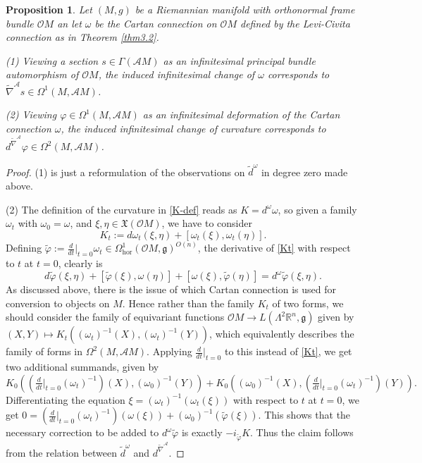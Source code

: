 \documentclass[12pt,a4paper]{amsart}
\def\frak{\mathfrak}
\def\Bbb{\mathbb}
\def\Cal{\mathcal}
\let\phi\varphi
\newcommand{\om}{\omega}
\newcommand{\ph}{\phi}
\newcommand{\Ga}{\Gamma}
\newcommand{\La}{\Lambda}
\newcommand{\Om}{\Omega}
\newcommand{\tn}{\widetilde{\nabla}}
\newcommand{\hor}{\text{hor}}
\newcounter{theorem}
\numberwithin{theorem}{section}
\numberwithin{equation}{section}
\newtheorem{prop}[theorem]{Proposition}
\theoremstyle{definition}
\theoremstyle{remark}
\begin{document}
\begin{prop}\label{prop3.4}
  Let $(M,g)$ be a Riemannian manifold with orthonormal frame bundle $\Cal OM$ an let
  $\om$ be the Cartan connection on $\Cal OM$ defined by the Levi-Civita connection
  as in Theorem \ref{thm3.2}.

  (1) Viewing a section $s\in\Ga(\Cal AM)$ as an infinitesimal principal bundle
  automorphism of $\Cal OM$, the induced infinitesimal change of $\om$ corresponds to
  $\tn^{\Cal A}s\in\Om^1(M,\Cal AM)$.

  (2) Viewing $\ph\in\Om^1(M,\Cal AM)$ as an infinitesimal deformation of the Cartan
  connection $\om$, the induced infinitesimal change of curvature corresponds to
  $d^{\tn^{\Cal A}}\ph\in\Om^2(M,\Cal AM)$.
\end{prop}
\begin{proof}
(1) is just a reformulation of the observations on $\widetilde{d}^\om$ in degree zero
  made above.

(2) The definition of the curvature in \eqref{K-def} reads as $K=d^\om \om$, so given
  a family $\om_t$ with $\om_0=\om$, and $\xi,\eta\in\frak X(\Cal OM)$, we have to
  consider
  \begin{equation}\label{Kt}
    K_t:=d\om_t(\xi,\eta)+[\om_t(\xi),\om_t(\eta)].
  \end{equation}
  Defining $\widetilde{\ph}:=\frac{d}{dt}|_{t=0}\om_t\in\Om^1_{\hor}(\Cal OM,\frak
  g)^{O(n)}$, the derivative of \eqref{Kt} with respect to $t$ at $t=0$, clearly is
  $$
  d\widetilde{\ph}(\xi,\eta)+[\widetilde{\ph}(\xi),\om(\eta)]+[\om(\xi),\widetilde{\ph}(\eta)]=
  d^\om\widetilde{\ph}(\xi,\eta).
  $$
  As discussed above, there is the issue of which Cartan connection is used for
  conversion to objects on $M$. Hence rather than the family $K_t$ of two forms, we
  should consider the family of equivariant functions $\Cal OM\to L(\La^2\Bbb
  R^n,\frak g)$ given by $(X,Y)\mapsto K_t((\om_t)^{-1}(X),(\om_t)^{-1}(Y))$, which
  equivalently describes the family of forms in $\Om^2(M,\Cal AM)$. Applying
  $\frac{d}{dt}|_{t=0}$ to this instead of \eqref{Kt}, we get two additional
  summands, given by
  $$
  K_0((\tfrac{d}{dt}|_{t=0}(\om_t)^{-1})(X),(\om_0)^{-1}(Y))+K_0((\om_0)^{-1}(X),
  (\tfrac{d}{dt}|_{t=0}(\om_t)^{-1})(Y)).
  $$ Differentiating the equation $\xi=(\om_t)^{-1}(\om_t(\xi))$ with respect to $t$
  at $t=0$, we get
  $0=(\frac{d}{dt}|_{t=0}(\om_t)^{-1})(\om(\xi))+(\om_0)^{-1}(\widetilde{\ph}(\xi))$. This
  shows that the necessary correction to be added to $d^\om\widetilde{\ph}$ is
  exactly $-i_{\widetilde{\ph}}K$. Thus the claim follows from the relation between
  $\widetilde{d}^\om$ and $d^{\tn^{\Cal A}}$.
\end{proof}
\end{document}
